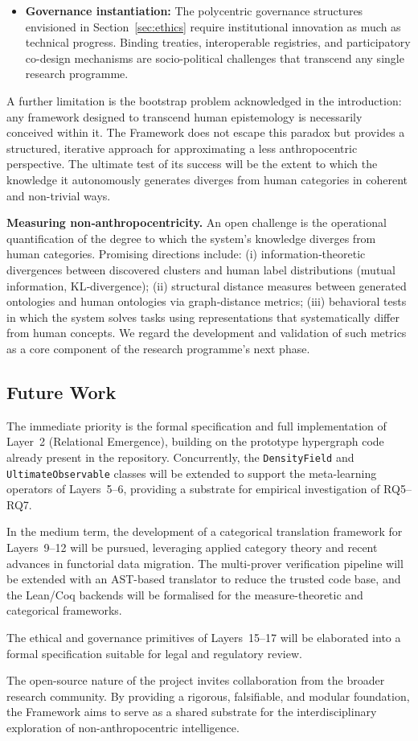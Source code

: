 \begin{itemize}
    \item \textbf{Governance instantiation:} The polycentric governance structures envisioned in Section~\ref{sec:ethics} require institutional innovation as much as technical progress. Binding treaties, interoperable registries, and participatory co-design mechanisms are socio-political challenges that transcend any single research programme.
\end{itemize}

A further limitation is the bootstrap problem acknowledged in the introduction: any framework designed to transcend human epistemology is necessarily conceived within it. The \Apeiron{} Framework does not escape this paradox but provides a structured, iterative approach for approximating a less anthropocentric perspective. The ultimate test of its success will be the extent to which the knowledge it autonomously generates diverges from human categories in coherent and non-trivial ways.

\noindent\textbf{Measuring non‑anthropocentricity.}
An open challenge is the operational quantification of the degree to which the system's knowledge diverges from human categories. Promising directions include: (i) information‑theoretic divergences between discovered clusters and human label distributions (mutual information, KL‑divergence); (ii) structural distance measures between generated ontologies and human ontologies via graph‑distance metrics; (iii) behavioral tests in which the system solves tasks using representations that systematically differ from human concepts. We regard the development and validation of such metrics as a core component of the research programme's next phase.

\subsection{Future Work}

The immediate priority is the formal specification and full implementation of Layer~2 (Relational Emergence), building on the prototype hypergraph code already present in the repository. Concurrently, the \texttt{DensityField} and \texttt{UltimateObservable} classes will be extended to support the meta-learning operators of Layers~5--6, providing a substrate for empirical investigation of RQ5--RQ7.

In the medium term, the development of a categorical translation framework for Layers~9--12 will be pursued, leveraging applied category theory \cite{fong2019} and recent advances in functorial data migration. The multi-prover verification pipeline will be extended with an AST-based translator to reduce the trusted code base, and the Lean/Coq backends will be formalised for the measure-theoretic and categorical frameworks.

The ethical and governance primitives of Layers~15--17 will be elaborated into a formal specification suitable for legal and regulatory review.

The open-source nature of the project invites collaboration from the broader research community. By providing a rigorous, falsifiable, and modular foundation, the \Apeiron{} Framework aims to serve as a shared substrate for the interdisciplinary exploration of non-anthropocentric intelligence.